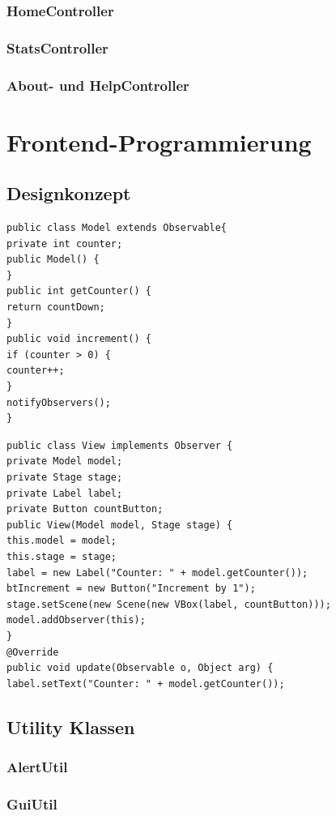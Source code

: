 \subsubsection{HomeController}
\subsubsection{StatsController}
\subsubsection{About- und HelpController}


\section{Frontend-Programmierung}
\subsection{Designkonzept}



\begin{lstlisting}[style=java,caption=Java Codebeispiel,label=Model]
public class Model extends Observable{
private int counter;
public Model() {
}
public int getCounter() {
return countDown;
}
public void increment() {
if (counter > 0) {
counter++;
}
notifyObservers();
}
\end{lstlisting}

\begin{lstlisting}[style=java,caption=Die Klasse View,label=View]
public class View implements Observer {
private Model model;
private Stage stage;
private Label label;
private Button countButton;
public View(Model model, Stage stage) {
this.model = model;
this.stage = stage;
label = new Label("Counter: " + model.getCounter());
btIncrement = new Button("Increment by 1");
stage.setScene(new Scene(new VBox(label, countButton)));
model.addObserver(this);
}
@Override
public void update(Observable o, Object arg) {
label.setText("Counter: " + model.getCounter());
\end{lstlisting}
\subsection{Utility Klassen}
\subsubsection{AlertUtil}
\subsubsection{GuiUtil}
